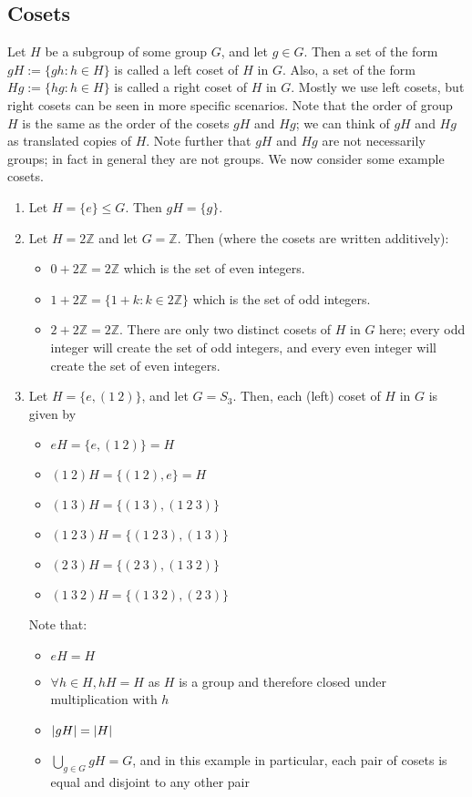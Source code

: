 \subsection{Cosets}
Let \(H\) be a subgroup of some group \(G\), and let \(g \in G\).
Then a set of the form \(gH := \{ gh : h \in H \}\) is called a left coset of \(H\) in \(G\).
Also, a set of the form \(Hg := \{ hg : h \in H \}\) is called a right coset of \(H\) in \(G\).
Mostly we use left cosets, but right cosets can be seen in more specific scenarios.
Note that the order of group \(H\) is the same as the order of the cosets \(gH\) and \(Hg\); we can think of \(gH\) and \(Hg\) as translated copies of \(H\).
Note further that \(gH\) and \(Hg\) are not necessarily groups; in fact in general they are not groups.
We now consider some example cosets.
\begin{enumerate}
	\item Let \(H = \{ e \} \leq G\).
	      Then \(gH = \{ g \}\).
	\item Let \(H = 2\mathbb Z\) and let \(G = \mathbb Z\).
	      Then (where the cosets are written additively):
	      \begin{itemize}
		      \item \(0 + 2\mathbb Z = 2\mathbb Z\) which is the set of even integers.
		      \item \(1 + 2\mathbb Z = \{ 1 + k: k \in 2\mathbb Z \}\) which is the set of odd integers.
		      \item \(2 + 2\mathbb Z = 2\mathbb Z\).
		            There are only two distinct cosets of \(H\) in \(G\) here; every odd integer will create the set of odd integers, and every even integer will create the set of even integers.
	      \end{itemize}
	\item Let \(H = \{ e, (1\ 2) \}\), and let \(G = S_3\).
	      Then, each (left) coset of \(H\) in \(G\) is given by
	      \begin{itemize}
		      \item \(eH = \{ e, (1\ 2) \} = H\)
		      \item \((1\ 2)H = \{ (1\ 2), e \} = H\)
		      \item \((1\ 3)H = \{ (1\ 3), (1\ 2\ 3) \}\)
		      \item \((1\ 2\ 3)H = \{ (1\ 2\ 3), (1\ 3) \}\)
		      \item \((2\ 3)H = \{ (2\ 3), (1\ 3\ 2) \}\)
		      \item \((1\ 3\ 2)H = \{ (1\ 3\ 2), (2\ 3) \}\)
	      \end{itemize}
	      Note that:
	      \begin{itemize}
		      \item \(eH = H\)
		      \item \(\forall h \in H, hH = H\) as \(H\) is a group and therefore closed under multiplication with \(h\)
		      \item \(\abs{gH} = \abs{H}\)
		      \item \(\bigcup_{g\in G} gH = G\), and in this example in particular, each pair of cosets is equal and disjoint to any other pair
	      \end{itemize}
\end{enumerate}

